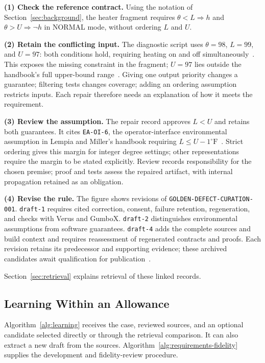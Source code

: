 \textbf{(1) Check the reference contract.} Using the notation of Section~\ref{sec:background}, the heater fragment requires $\theta<L\Rightarrow h$ and $\theta>U\Rightarrow\neg h$ in NORMAL mode, without ordering $L$ and $U$.

\textbf{(2) Retain the conflicting input.} The diagnostic script uses $\theta=98$, $L=99$, and $U=97$: both conditions hold, requiring heating on and off simultaneously~\cite{scpCheckpoint}. This exposes the missing constraint in the fragment; $U=97$ lies outside the handbook's full upper-bound range~\cite{lempia2009faa}. Giving one output priority changes a guarantee; filtering tests changes coverage; adding an ordering assumption restricts inputs. Each repair therefore needs an explanation of how it meets the requirement.

\textbf{(3) Review the assumption.} The repair record approves $L<U$ and retains both guarantees. It cites \texttt{EA-OI-6}, the operator-interface environmental assumption in Lempia and Miller's handbook requiring $L\leq U-1^{\circ}\mathrm{F}$~\cite[Appendix A.3.4, p.~A-11]{lempia2009faa}. Strict ordering gives this margin for integer degree settings; other representations require the margin to be stated explicitly. Review records responsibility for the chosen premise; proof and tests assess the repaired artifact, with internal propagation retained as an obligation.

\textbf{(4) Revise the rule.} The figure shows revisions of \texttt{GOLDEN-\allowbreak{}DEFECT-\allowbreak{}CURATION-001}. \texttt{draft-1} requires cited correction, consent, failure retention, regeneration, and checks with Verus and GumboX. \texttt{draft-2} distinguishes environmental assumptions from software guarantees. \texttt{draft-4} adds the complete sources and build context and requires reassessment of regenerated contracts and proofs. Each revision retains its predecessor and supporting evidence; these archived candidates await qualification for publication~\cite{scpCheckpoint}.

Section~\ref{sec:retrieval} explains retrieval of these linked records.

\subsection{Learning Within an Allowance}
Algorithm~\ref{alg:learning} receives the case, reviewed sources, and an optional candidate selected directly or through the retrieval comparison. It can also extract a new draft from the sources. Algorithm~\ref{alg:requirements-fidelity} supplies the development and fidelity-review procedure.



